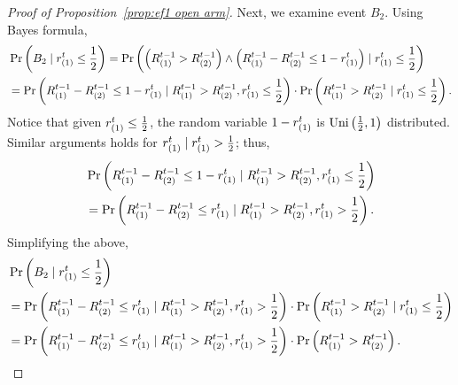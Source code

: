 \begin{proof}[Proof of Proposition~\ref{prop:ef1 open arm}]
Next, we examine event $B_2$. Using Bayes formula,
\begin{align*}
    &\Pr\left( B_2 \mid r_{(1)}^t \leq \frac{1}{2}  \right) =
    \Pr\left(  \left(R^{t-1}_{(1)} > R^{t-1}_{(2)} \right) \wedge \left( R^{t-1}_{(1)} - R^{t-1}_{(2)} \leq 1 - r_{(1)}^t \right) \mid r_{(1)}^t \leq \frac{1}{2}  \right)
    \\& = \Pr\left( R^{t-1}_{(1)} - R^{t-1}_{(2)} \leq 1 - r_{(1)}^t \mid R^{t-1}_{(1)} > R^{t-1}_{(2)}, r_{(1)}^t \leq \frac{1}{2}  \right)\cdot \Pr\left( R^{t-1}_{(1)} > R^{t-1}_{(2)} \mid r_{(1)}^t \leq \frac{1}{2} \right).
\end{align*}
Notice that given $r_{(1)}^t \leq \frac{1}{2}$, the random variable $1- r_{(1)}^t$ is $\text{Uni}\left(\frac{1}{2}, 1\right)$ distributed. Similar arguments holds for $r_{(1)}^t \mid r_{(1)}^t > \frac{1}{2}$; thus, 
\begin{align*}
&\Pr\left( R^{t-1}_{(1)} - R^{t-1}_{(2)} \leq 1 - r_{(1)}^t \mid R^{t-1}_{(1)} > R^{t-1}_{(2)}, r_{(1)}^t \leq \frac{1}{2}  \right)
\\&=
\Pr\left( R^{t-1}_{(1)} - R^{t-1}_{(2)} \leq r_{(1)}^t \mid R^{t-1}_{(1)} > R^{t-1}_{(2)}, r_{(1)}^t > \frac{1}{2}  \right).
\end{align*}
Simplifying the above,
\begin{align}\label{B2}
    & \Pr\left( B_2 \mid r_{(1)}^t \leq \frac{1}{2}  \right)
    \nonumber\\&
    = \Pr\left( R^{t-1}_{(1)} - R^{t-1}_{(2)} \leq r_{(1)}^t \mid R^{t-1}_{(1)} > R^{t-1}_{(2)}, r_{(1)}^t > \frac{1}{2}  \right)\cdot \Pr\left( R^{t-1}_{(1)} > R^{t-1}_{(2)} \mid r_{(1)}^t \leq \frac{1}{2} \right)\nonumber \\
    & = \Pr\left( R^{t-1}_{(1)} - R^{t-1}_{(2)} \leq r_{(1)}^t \mid R^{t-1}_{(1)} > R^{t-1}_{(2)}, r_{(1)}^t > \frac{1}{2}  \right)\cdot \Pr\left( R^{t-1}_{(1)} > R^{t-1}_{(2)} \right)
    .
\end{align}


\end{proof}
